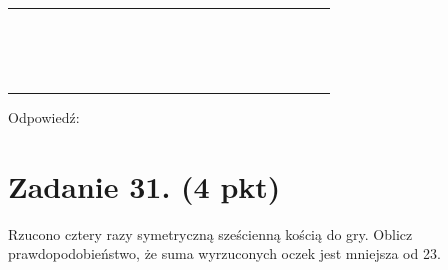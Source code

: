 \documentclass[10pt]{article}
\begin{document}
\begin{center}
\begin{tabular}{|c|c|c|c|c|c|c|c|c|c|c|c|c|c|c|c|c|c|c|c|c|c|c|}
\hline
 &  &  &  &  &  &  &  &  &  &  &  &  &  &  &  &  &  &  &  &  &  &  \\
\hline
 &  &  &  &  &  &  &  &  &  &  &  &  &  &  &  &  &  &  &  &  &  &  \\
\hline
 &  &  &  &  &  &  &  &  &  &  &  &  &  &  &  &  &  &  &  &  &  &  \\
\hline
 &  &  &  &  &  &  &  &  &  &  &  &  &  &  &  &  &  &  &  &  &  &  \\
\hline
 &  &  &  &  &  &  &  &  &  &  &  &  &  &  &  &  &  &  &  &  &  &  \\
\hline
 &  &  &  &  &  &  &  &  &  &  &  &  &  &  &  &  &  &  &  &  &  &  \\
\hline
 &  &  &  &  &  &  &  &  &  &  &  &  &  &  &  &  &  &  &  &  &  &  \\
\hline
 &  &  &  &  &  &  &  &  &  &  &  &  &  &  &  &  &  &  &  &  &  &  \\
\hline
 &  &  &  &  &  &  &  &  &  &  &  &  &  &  &  &  &  &  &  &  &  &  \\
\hline
 &  &  &  &  &  &  &  &  &  &  &  &  &  &  &  &  &  &  &  &  &  &  \\
\hline
 &  &  &  &  &  &  &  &  &  &  &  &  &  &  &  &  &  &  &  &  &  &  \\
\hline
 &  &  &  &  &  &  &  &  &  &  &  &  &  &  &  &  &  &  &  &  &  &  \\
\hline
 &  &  &  &  &  &  &  &  &  &  &  &  &  &  &  &  &  &  &  &  &  &  \\
\hline
 &  &  &  &  &  &  &  &  &  &  &  &  &  &  &  &  &  &  &  &  &  &  \\
\hline
 &  &  &  &  &  &  &  &  &  &  &  &  &  &  &  &  &  &  &  &  &  &  \\
\hline
 &  &  &  &  &  &  &  &  &  &  &  &  &  &  &  &  &  &  &  &  &  &  \\
\hline
 &  &  &  &  &  &  &  &  &  &  &  &  &  &  &  &  &  &  &  &  &  &  \\
\hline
\end{tabular}
\end{center}

Odpowiedź: \(\qquad\)

\section*{Zadanie 31. (4 pkt)}
Rzucono cztery razy symetryczną sześcienną kością do gry. Oblicz prawdopodobieństwo, że suma wyrzuconych oczek jest mniejsza od 23.
\end{document}
